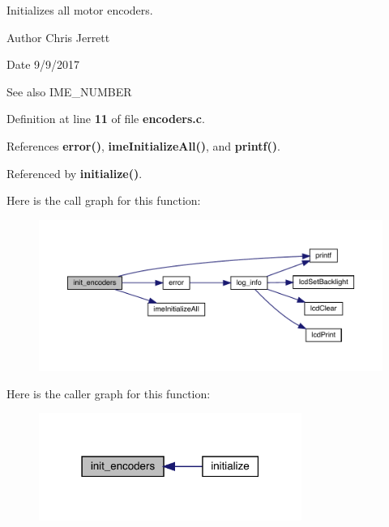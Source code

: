 Initializes all motor encoders. 

\begin{DoxyAuthor}{Author}
Chris Jerrett 
\end{DoxyAuthor}
\begin{DoxyDate}{Date}
9/9/2017 
\end{DoxyDate}
\begin{DoxySeeAlso}{See also}
I\+M\+E\+\_\+\+N\+U\+M\+B\+ER 
\end{DoxySeeAlso}


Definition at line \textbf{ 11} of file \textbf{ encoders.\+c}.



References \textbf{ error()}, \textbf{ ime\+Initialize\+All()}, and \textbf{ printf()}.



Referenced by \textbf{ initialize()}.


Here is the call graph for this function\+:
\nopagebreak
\begin{figure}[H]
\begin{center}
\leavevmode
\includegraphics[width=350pt]{encoders_8c_aa6ec1ca17e907babd52803ecba451cd3_cgraph}
\end{center}
\end{figure}
Here is the caller graph for this function\+:
\nopagebreak
\begin{figure}[H]
\begin{center}
\leavevmode
\includegraphics[width=243pt]{encoders_8c_aa6ec1ca17e907babd52803ecba451cd3_icgraph}
\end{center}
\end{figure}
